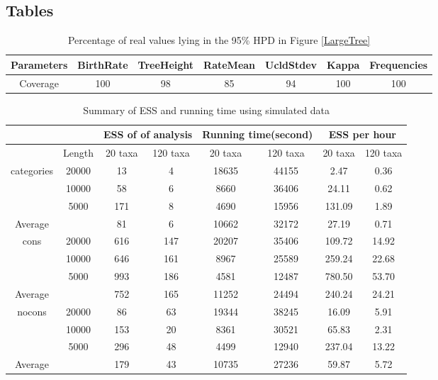 \documentclass{bmcart}
\begin{document}
\begin{backmatter}
\clearpage
\section*{Tables}
\begin{table}[h!]
  \centering
\begin{tabular}{c|cccccc}
\hline
Parameters&BirthRate&TreeHeight&RateMean&UcldStdev&Kappa&Frequencies\\
\hline
Coverage&100&98&85&94&100&100\\
\hline
\end{tabular}
\caption{Percentage of real values lying in the 95\% HPD in Figure \ref{LargeTree} }\label{num_hpd}
\end{table}

\begin{table}[h!]
  \centering
\begin{tabular}{cc|cc|cc|cc}
\hline
&&\multicolumn{2}{c|}{ESS of of analysis}&\multicolumn{2}{c|}{Running time(second)}&\multicolumn{2}{c}{ESS per hour}\\
\hline
&Length&20 taxa&120 taxa&20 taxa&120 taxa&20 taxa&120 taxa\\
categories&20000&13&4&18635&44155&2.47&0.36\\
&10000&58&6&8660&36406&24.11&0.62\\
&5000&171&8&4690&15956&131.09&1.89\\
Average&&81&6&10662&32172&27.19&0.71\\
\hline
cons&20000&616&147&20207&35406&109.72&14.92\\
&10000&646&161&8967&25589&259.24&22.68\\
&5000&993&186&4581&12487&780.50&53.70\\
Average&&752&165&11252&24494&240.24&24.21\\
\hline
nocons&20000&86&63&19344&38245&16.09&5.91\\
&10000&153&20&8361&30521&65.83&2.31\\
&5000&296&48&4499&12940&237.04&13.22\\
Average&&179&43&10735&27236&59.87&5.72\\
\hline
\end{tabular}
\caption{Summary of ESS and running time using simulated data}\label{eff_comp1}
\end{table}


\end{backmatter}
\end{document}
